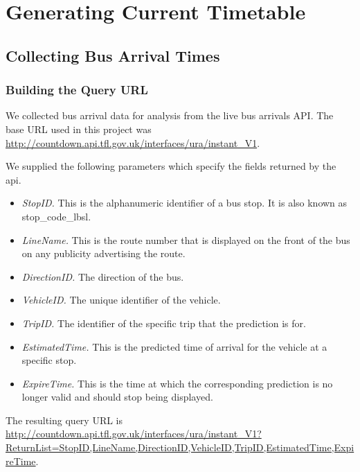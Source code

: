 \section{Generating Current Timetable}
\label{sec:current_timetable_generation}

\subsection{Collecting Bus Arrival Times}
\label{sec:collecting_arrival_times}

\subsubsection{Building the Query URL}
\par We collected bus arrival data for analysis from the live bus arrivals API. The base URL used in this project was \url{http://countdown.api.tfl.gov.uk/interfaces/ura/instant_V1}.

\par We supplied the following parameters which specify the fields returned by the \acrshort{api}.

\begin{itemize}
  \item \textit{StopID.} This is the alphanumeric identifier of a bus stop. It is also known as stop\_code\_lbsl.
  \item \textit{LineName.} This is the route number that is displayed on the front of the bus on any publicity advertising the route.
  \item \textit{DirectionID.} The direction of the bus.
  \item \textit{VehicleID.} The unique identifier of the vehicle.
  \item \textit{TripID.} The identifier of the specific trip that the prediction is for.
  \item \textit{EstimatedTime.} This is the predicted time of arrival for the vehicle at a specific stop.
  \item \textit{ExpireTime.} This is the time at which the corresponding prediction is no longer valid and should stop being displayed.
\end{itemize}

\par The resulting query URL is \sloppy \url{http://countdown.api.tfl.gov.uk/interfaces/ura/instant_V1?ReturnList=StopID,LineName,DirectionID,VehicleID,TripID,EstimatedTime,ExpireTime}.

